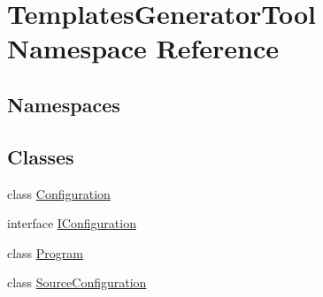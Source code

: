 \hypertarget{namespace_templates_generator_tool}{}\section{Templates\+Generator\+Tool Namespace Reference}
\label{namespace_templates_generator_tool}
\subsection*{Namespaces}
\begin{DoxyCompactItemize}
\end{DoxyCompactItemize}
\subsection*{Classes}
\begin{DoxyCompactItemize}
\item 
class \mbox{\hyperlink{class_templates_generator_tool_1_1_configuration}{Configuration}}
\item 
interface \mbox{\hyperlink{interface_templates_generator_tool_1_1_i_configuration}{I\+Configuration}}
\item 
class \mbox{\hyperlink{class_templates_generator_tool_1_1_program}{Program}}
\item 
class \mbox{\hyperlink{class_templates_generator_tool_1_1_source_configuration}{Source\+Configuration}}
\end{DoxyCompactItemize}
